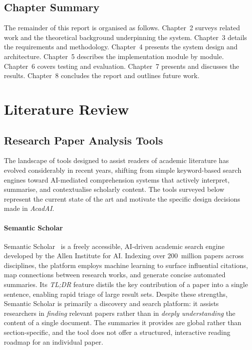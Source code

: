 \documentclass[12pt,a4paper]{report}
\begin{document}
\section{Chapter Summary}

The remainder of this report is organised as follows. Chapter~2 surveys related
work and the theoretical background underpinning the system. Chapter~3 details
the requirements and methodology. Chapter~4 presents the system design and
architecture. Chapter~5 describes the implementation module by module. Chapter~6
covers testing and evaluation. Chapter~7 presents and discusses the results.
Chapter~8 concludes the report and outlines future work.

\chapter{Literature Review}

\section{Research Paper Analysis Tools}

The landscape of tools designed to assist readers of academic literature has
evolved considerably in recent years, shifting from simple keyword-based search
engines toward AI-mediated comprehension systems that actively interpret,
summarise, and contextualise scholarly content. The tools surveyed below
represent the current state of the art and motivate the specific design
decisions made in \textit{AcadAI}.

\subsubsection{Semantic Scholar}

Semantic Scholar~\cite{semanticscholar} is a freely accessible, AI-driven
academic search engine developed by the Allen Institute for AI. Indexing over
200~million papers across disciplines, the platform employs machine learning to
surface influential citations, map connections between research works, and
generate concise automated summaries. Its \textit{TL;DR} feature distils the
key contribution of a paper into a single sentence, enabling rapid triage of
large result sets. Despite these strengths, Semantic Scholar is primarily a
discovery and search platform: it assists researchers in \emph{finding} relevant
papers rather than in \emph{deeply understanding} the content of a single
document. The summaries it provides are global rather than section-specific, and
the tool does not offer a structured, interactive reading roadmap for an
individual paper.
\end{document}
